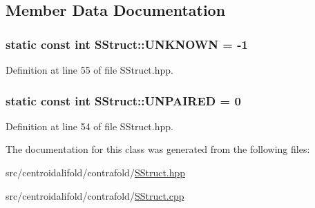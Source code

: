 \subsection{Member Data Documentation}
\hypertarget{class_s_struct_a052fbb16db25234602be6f6c373f494b}{
\subsubsection[{U\+N\+K\+N\+O\+W\+N}]{\setlength{\rightskip}{0pt plus 5cm}static const int S\+Struct\+::\+U\+N\+K\+N\+O\+W\+N = -\/1\hspace{0.3cm}{\ttfamily [static]}}}\label{class_s_struct_a052fbb16db25234602be6f6c373f494b}


Definition at line 55 of file S\+Struct.\+hpp.

\hypertarget{class_s_struct_a1a64a4ded004c8a15ca07a0110696878}{
\subsubsection[{U\+N\+P\+A\+I\+R\+E\+D}]{\setlength{\rightskip}{0pt plus 5cm}static const int S\+Struct\+::\+U\+N\+P\+A\+I\+R\+E\+D = 0\hspace{0.3cm}{\ttfamily [static]}}}\label{class_s_struct_a1a64a4ded004c8a15ca07a0110696878}


Definition at line 54 of file S\+Struct.\+hpp.



The documentation for this class was generated from the following files\+:\begin{DoxyCompactItemize}
\item 
src/centroidalifold/contrafold/\hyperlink{centroidalifold_2contrafold_2_s_struct_8hpp}{S\+Struct.\+hpp}\item 
src/centroidalifold/contrafold/\hyperlink{centroidalifold_2contrafold_2_s_struct_8cpp}{S\+Struct.\+cpp}\end{DoxyCompactItemize}
